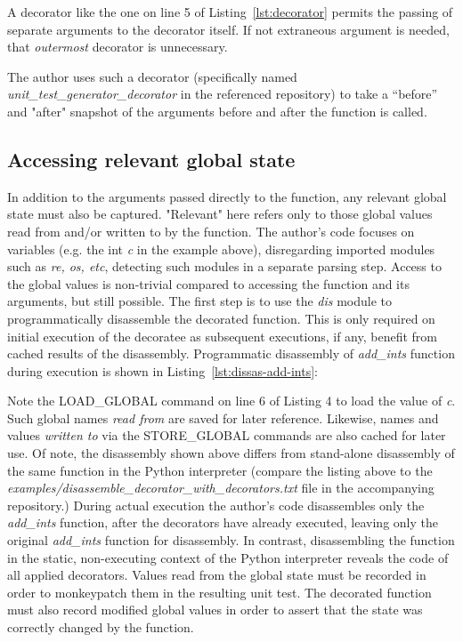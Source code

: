 A decorator like the one on line 5 of Listing~\ref{lst:decorator} permits
the passing of separate arguments to the decorator itself.  
If not extraneous argument is needed, that \textit{outermost} decorator
is unnecessary.

The author uses such a decorator (specifically named 
\break
\textit{unit\_test\_generator\_decorator} in the referenced repository) to take
 a “before” and "after" snapshot of the arguments
before and after the function is called.

%
\subsection{Accessing relevant global state}\label{sec:approach-internal-2}

In addition to the arguments passed directly to the function, any relevant 
global state must also be captured. "Relevant" here refers only to those 
global values read from and/or written to by the function.
The author's code focuses on variables (e.g. the int \textit{c} in the example above), 
disregarding imported modules such as \textit{re, os, etc}, detecting such
modules in a separate parsing step.
Access to the global values is non-trivial compared to accessing the function 
and its arguments, but still possible.  The first step is to use the \textit{dis}
module to programmatically disassemble the decorated function.  This is only 
required on initial execution of the decoratee as subsequent executions, if any, 
benefit from cached results of the disassembly.
Programmatic disassembly of \textit{add\_ints} function during execution is shown
in Listing~\ref{lst:dissas-add-ints}:



Note the LOAD\_GLOBAL command on line 6 of Listing 4 to load the value of 
\textit{c}.  Such global names \textit{read from} are saved for later reference.  
Likewise, names and values \textit{written to} via 
the STORE\_GLOBAL commands are also cached for later use.
%
Of note, the disassembly shown above differs from stand-alone disassembly of 
the same function in the Python interpreter (compare the listing above to the
\textit{examples/disassemble\_decorator\_with\_decorators.txt} file in the 
accompanying repository.)
During actual execution the author's code disassembles only the
\textit{add\_ints} function, after the decorators
have already executed, leaving only the original  \textit{add\_ints}
function for disassembly.
In contrast, disassembling the function in the static, non-executing context of
the Python interpreter reveals the code of all applied decorators.  
%
Values read from the global state must be recorded 
in order to monkeypatch them in the resulting unit test.
%
The decorated function must also record modified global values in
order to assert that the state was correctly changed by the function.

